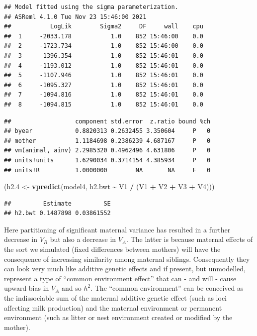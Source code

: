 \documentclass[
  12pt,
]{book}
\newenvironment{Shaded}{\begin{snugshade}}{\end{snugshade}}
\newcommand{\FloatTok}[1]{\textcolor[rgb]{0.00,0.00,0.81}{#1}}
\newcommand{\KeywordTok}[1]{\textcolor[rgb]{0.13,0.29,0.53}{\textbf{#1}}}
\newcommand{\NormalTok}[1]{#1}
\newcommand{\OperatorTok}[1]{\textcolor[rgb]{0.81,0.36,0.00}{\textbf{#1}}}
\newcommand{\StringTok}[1]{\textcolor[rgb]{0.31,0.60,0.02}{#1}}
\begin{document}
\begin{verbatim}
## Model fitted using the sigma parameterization.
## ASReml 4.1.0 Tue Nov 23 15:46:00 2021
##           LogLik        Sigma2     DF     wall    cpu
##  1     -2033.178           1.0    852 15:46:00    0.0
##  2     -1723.734           1.0    852 15:46:00    0.0
##  3     -1396.354           1.0    852 15:46:01    0.0
##  4     -1193.012           1.0    852 15:46:01    0.0
##  5     -1107.946           1.0    852 15:46:01    0.0
##  6     -1095.327           1.0    852 15:46:01    0.0
##  7     -1094.816           1.0    852 15:46:01    0.0
##  8     -1094.815           1.0    852 15:46:01    0.0
\end{verbatim}

\begin{Shaded}
\end{Shaded}

\begin{verbatim}
##                  component std.error  z.ratio bound %ch
## byear            0.8820313 0.2632455 3.350604     P   0
## mother           1.1184698 0.2386239 4.687167     P   0
## vm(animal, ainv) 2.2985320 0.4962496 4.631806     P   0
## units!units      1.6290034 0.3714154 4.385934     P   0
## units!R          1.0000000        NA       NA     F   0
\end{verbatim}

\begin{Shaded}
\begin{Highlighting}[]
\NormalTok{(h2}\FloatTok{.4}\NormalTok{ \textless{}{-}}\StringTok{ }\KeywordTok{vpredict}\NormalTok{(model4, h2.bwt }\OperatorTok{\textasciitilde{}}\StringTok{ }\NormalTok{V1 }\OperatorTok{/}\StringTok{ }\NormalTok{(V1 }\OperatorTok{+}\StringTok{ }\NormalTok{V2 }\OperatorTok{+}\StringTok{ }\NormalTok{V3 }\OperatorTok{+}\StringTok{ }\NormalTok{V4)))}
\end{Highlighting}
\end{Shaded}

\begin{verbatim}
##         Estimate         SE
## h2.bwt 0.1487898 0.03861552
\end{verbatim}

Here partitioning of significant maternal variance has resulted in a further decrease in \(V_R\) but also a decrease in \(V_A\). The latter is because maternal effects of the sort we simulated (fixed differences between mothers) will have the consequence of increasing similarity among maternal siblings. Consequently they can look very much like additive genetic effects and if present, but unmodelled, represent a type of ``common environment effect'' that can - and will - cause upward bias in \(V_A\) and so \(h^2\).
The ``common environment'' can be conceived as the indissociable sum of the maternal additive genetic effect (such as loci affecting milk production) and the maternal environment or permanent environment (such as litter or nest environment created or modified by the mother).
\end{document}
